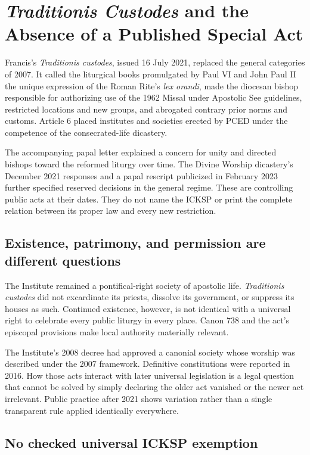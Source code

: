 \section{\emph{Traditionis Custodes} and the Absence of a Published Special Act}

Francis's \emph{Traditionis custodes}, issued 16 July 2021, replaced the general categories of 2007. It called the liturgical books promulgated by Paul VI and John Paul II the unique expression of the Roman Rite's \emph{lex orandi}, made the diocesan bishop responsible for authorizing use of the 1962 Missal under Apostolic See guidelines, restricted locations and new groups, and abrogated contrary prior norms and customs. Article 6 placed institutes and societies erected by PCED under the competence of the consecrated-life dicastery.

The accompanying papal letter explained a concern for unity and directed bishops toward the reformed liturgy over time. The Divine Worship dicastery's December 2021 responses and a papal rescript publicized in February 2023 further specified reserved decisions in the general regime. These are controlling public acts at their dates. They do not name the ICKSP or print the complete relation between its proper law and every new restriction.

\subsection{Existence, patrimony, and permission are different questions}

The Institute remained a pontifical-right society of apostolic life. \emph{Traditionis custodes} did not excardinate its priests, dissolve its government, or suppress its houses as such. Continued existence, however, is not identical with a universal right to celebrate every public liturgy in every place. Canon 738 and the act's episcopal provisions make local authority materially relevant.

The Institute's 2008 decree had approved a canonial society whose worship was described under the 2007 framework. Definitive constitutions were reported in 2016. How those acts interact with later universal legislation is a legal question that cannot be solved by simply declaring the older act vanished or the newer act irrelevant. Public practice after 2021 shows variation rather than a single transparent rule applied identically everywhere.

\subsection{No checked universal ICKSP exemption}

